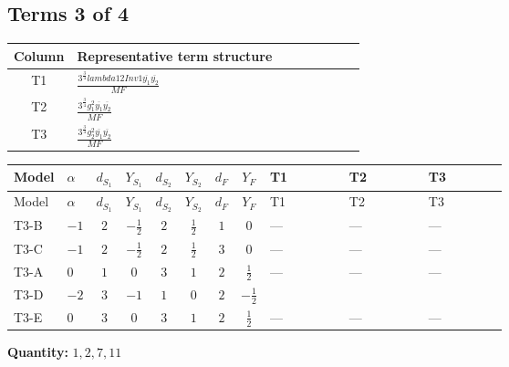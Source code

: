 \documentclass[8pt]{article}
\begin{document}
\begin{landscape}
\subsection*{Terms 3 of 4}
\begin{center}
\begin{tabular}{@{}c >{\raggedright\arraybackslash}p{0.82\linewidth}@{}}
\toprule
Column & Representative term structure \\
\midrule
T1 & \(\displaystyle \frac{3^{\frac{3}{4}} lambda12Inv1 \overline{y_{1}} \overline{y_{2}}}{MF}\) \\
\midrule
T2 & \(\displaystyle \frac{3^{\frac{3}{4}} g_{1}^{2} \overline{y_{1}} \overline{y_{2}}}{MF}\) \\
\midrule
T3 & \(\displaystyle \frac{3^{\frac{3}{4}} g_{2}^{2} \overline{y_{1}} \overline{y_{2}}}{MF}\) \\
\midrule
\bottomrule
\end{tabular}
\end{center}
\smallskip
\tiny
\begin{longtable}{@{}llcccccc >{\raggedright\arraybackslash}p{0.21\linewidth} >{\raggedright\arraybackslash}p{0.21\linewidth} >{\raggedright\arraybackslash}p{0.21\linewidth}@{}}
\toprule
Model & $\alpha$ & $d_{S_1}$ & $Y_{S_1}$ & $d_{S_2}$ & $Y_{S_2}$ & $d_F$ & $Y_F$ & T1 & T2 & T3 \\
\midrule
\endfirsthead
\toprule
Model & $\alpha$ & $d_{S_1}$ & $Y_{S_1}$ & $d_{S_2}$ & $Y_{S_2}$ & $d_F$ & $Y_F$ & T1 & T2 & T3 \\
\midrule
\endhead
T3-B & $-1$ & $2$ & $-\frac{1}{2}$ & $2$ & $\frac{1}{2}$ & $1$ & $0$ & --- & --- & --- \\
\midrule
T3-C & $-1$ & $2$ & $-\frac{1}{2}$ & $2$ & $\frac{1}{2}$ & $3$ & $0$ & --- & --- & --- \\
\midrule
T3-A & $0$ & $1$ & $0$ & $3$ & $1$ & $2$ & $\frac{1}{2}$ & --- & --- & --- \\
\midrule
T3-D & $-2$ & $3$ & $-1$ & $1$ & $0$ & $2$ & $-\frac{1}{2}$ & \scriptsize\adjustbox{max width=\linewidth}{$\begin{gathered} \frac{3^{\frac{3}{4}} lambda12Inv1 \overline{y_{1}} \overline{y_{2}}}{6 MF}\end{gathered}$} & \scriptsize\adjustbox{max width=\linewidth}{$\begin{gathered} \frac{3^{\frac{3}{4}} g_{1}^{2} \overline{y_{1}} \overline{y_{2}}}{8 MF}\end{gathered}$} & \scriptsize\adjustbox{max width=\linewidth}{$\begin{gathered} \frac{25 \cdot 3^{\frac{3}{4}} g_{2}^{2} \overline{y_{1}} \overline{y_{2}}}{24 MF}\end{gathered}$} \\
\midrule
T3-E & $0$ & $3$ & $0$ & $3$ & $1$ & $2$ & $\frac{1}{2}$ & --- & --- & --- \\
\midrule
\bottomrule
\end{longtable}
\clearpage
\noindent\textbf{Quantity: }$\mathrm{1,2,7,11}$\par\smallskip

\end{landscape}
\end{document}
